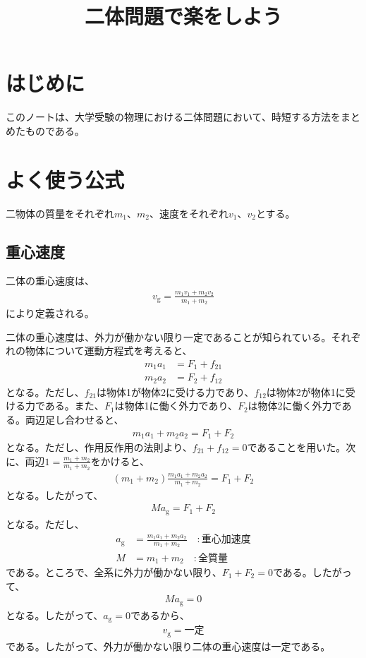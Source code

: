 \documentclass[a4paper,11pt]{jsarticle}
\numberwithin{equation}{section}
\begin{document}
\title{二体問題で楽をしよう}
\maketitle

\section{はじめに}
このノートは、大学受験の物理における二体問題において、時短する方法をまとめたものである。

\section{よく使う公式}
二物体の質量をそれぞれ$m_1$、$m_2$、速度をそれぞれ$v_1$、$v_2$とする。

\subsection{重心速度}
二体の重心速度は、
\begin{align}
    v_{\text{g}} = \frac{m_1v_1 + m_2v_2}{m_1 + m_2}
\end{align}
により定義される。

二体の重心速度は、外力が働かない限り一定であることが知られている。それぞれの物体について運動方程式を考えると、
\begin{align}
    m_1a_1 &= F_{\text{1}} + f_{21} \\
    m_2a_2 &= F_{\text{2}} + f_{12}
\end{align}
となる。ただし、$f_{21}$は物体1が物体2に受ける力であり、$f_{12}$は物体2が物体1に受ける力である。また、$F_{\text{1}}$は物体1に働く外力であり、$F_{\text{2}}$は物体2に働く外力である。両辺足し合わせると、
\begin{align}
        m_1a_1 + m_2a_2 = F_{\text{1}} + F_{\text{2}}
\end{align}
となる。ただし、作用反作用の法則より、$f_{21} + f_{12} = 0$であることを用いた。次に、両辺$1 = \frac{m_1 + m_2}{m_1 + m_2}$をかけると、
\begin{align}
        (m_1 + m_2)\frac{m_1a_1 + m_2a_2}{m_1 + m_2} = F_{\text{1}} + F_{\text{2}}
\end{align}
となる。したがって、
\begin{align}
        Ma_{\text{g}} = F_{\text{1}} + F_{\text{2}}
\end{align}
となる。ただし、
\begin{align}
        a_{\text{g}} &= \frac{m_1a_1 + m_2a_2}{m_1 + m_2} \quad :\text{重心加速度} \\
        M &= m_1 + m_2 \quad :\text{全質量}
\end{align}
である。ところで、全系に外力が働かない限り、$F_{\text{1}} + F_{\text{2}} = 0$である。したがって、
\begin{align}
    Ma_{\text{g}} = 0
\end{align}
となる。したがって、$a_{\text{g}} = 0$であるから、
\begin{align}
    v_{\text{g}} = \text{一定}
\end{align}
である。したがって、外力が働かない限り二体の重心速度は一定である。
\end{document}
